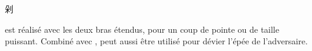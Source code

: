 \section{\Duo}
\Duo{} \begin{CJK*}{UTF8}{bsmi}剁\end{CJK*} est réalisé avec les deux bras étendus, pour un coup de pointe ou de taille puissant.
Combiné avec \Mo{}, \Duo{} peut aussi \^{e}tre utilisé pour dévier l'épée de l'adversaire.
